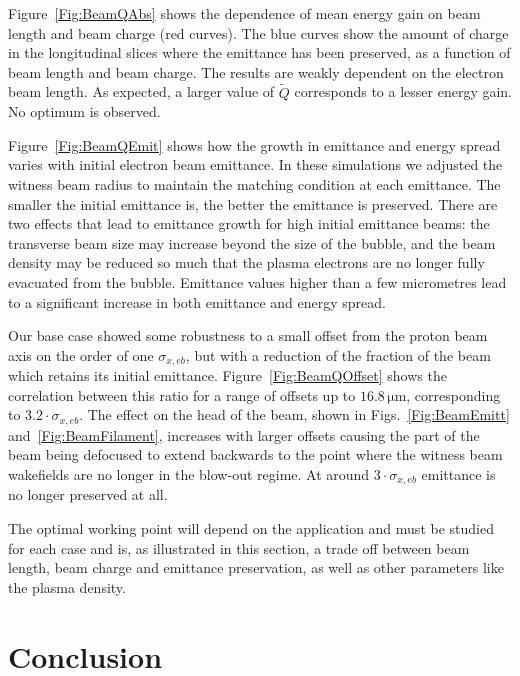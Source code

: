 \documentclass[aps,prstab,reprint,amsmath,amssymb,groupedaddress]{revtex4-1}
\newcommand{\unit}[1]{\,\mathrm{#1}}
\begin{document}
Figure~\ref{Fig:BeamQAbs} shows the dependence of mean energy gain on beam length and beam charge (red curves). The blue curves show the amount of charge in the longitudinal slices where the emittance has been preserved, as a function of beam length and beam charge. The results are weakly dependent on the electron beam length. As expected, a larger value of $\widetilde{Q}$ corresponds to a lesser energy gain. No optimum is observed.

Figure~\ref{Fig:BeamQEmit} shows how the growth in emittance and energy spread varies with initial electron beam emittance. In these simulations we adjusted the witness beam radius to maintain the matching condition at each emittance. The smaller the initial emittance is, the better the emittance is preserved. There are two effects that lead to emittance growth for high initial emittance beams: the transverse beam size may increase beyond the size of the bubble, and the beam density may be reduced so much that the plasma electrons are no longer fully evacuated from the bubble. Emittance values higher than a few micrometres lead to a significant increase in both emittance and energy spread. 

Our base case showed some robustness to a small offset from the proton beam axis on the order of one $\sigma_{x,eb}$, but with a reduction of the fraction of the beam which retains its initial emittance. Figure~\ref{Fig:BeamQOffset} shows the correlation between this ratio for a range of offsets up to $16.8\unit{\mu m}$, corresponding to $3.2\cdot\sigma_{x,eb}$. The effect on the head of the beam, shown in Figs.~\ref{Fig:BeamEmitt} and~\ref{Fig:BeamFilament}, increases with larger offsets causing the part of the beam being defocused to extend backwards to the point where the witness beam wakefields are no longer in the blow-out regime. At around $3\cdot\sigma_{x,eb}$ emittance is no longer preserved at all.

The optimal working point will depend on the application and must be studied for each case and is, as illustrated in this section, a trade off between beam length, beam charge and emittance preservation, as well as other parameters like the plasma density.   

\section{Conclusion}\label{S:C}
\end{document}
